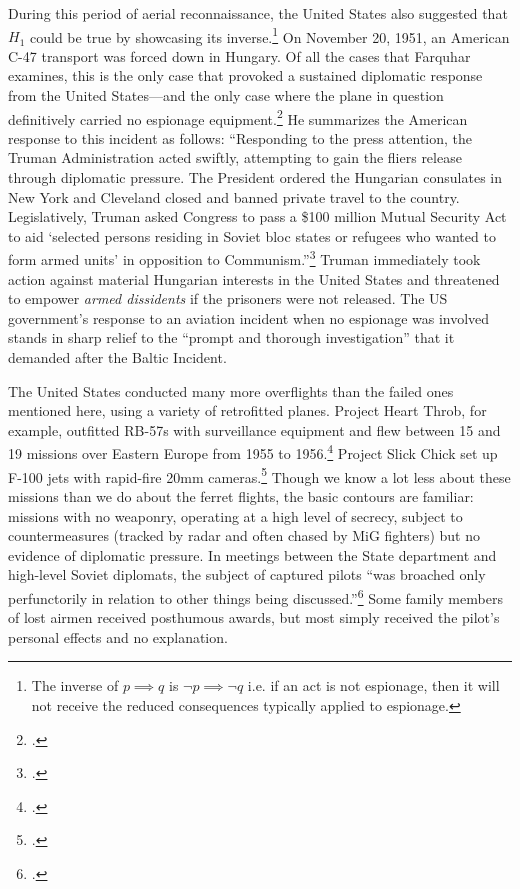 \documentclass[14pt]{extarticle}
\begin{document}
During this period of aerial reconnaissance, the United States also suggested that $H_1$ could be true by showcasing its inverse.\footnote{The inverse of $p \implies q$ is $\neg p \implies \neg q$ i.e. if an act is not espionage, then it will not receive the reduced consequences typically applied to espionage.} On November 20, 1951, an American C-47 transport was forced down in Hungary. Of all the cases that Farquhar examines, this is the only case that provoked a sustained diplomatic response from the United States---and the only case where the plane in question definitively carried no espionage equipment.\footcite[While the ferret flights were perfectly calibrated to fit as much radio surveillance equipment as possible, the only evidence of espionage that the Soviets were able to produce from the C-47---a plane that they recovered intact---was a portable radio, two extra parachutes, and some packets of warm blankets. Because it was not a ferret flight, the C-47 is omitted from the Peterson list as well.]{the_united_press_soviet_1951} He summarizes the American response to this incident as follows: \enquote{Responding to the press attention, the Truman Administration acted swiftly, attempting to gain the fliers release through diplomatic pressure. The President ordered the Hungarian consulates in New York and Cleveland closed and banned private travel to the country. Legislatively, Truman asked Congress to pass a \$100 million Mutual Security Act to aid \enquote{selected persons residing in Soviet bloc states or refugees who wanted to form armed units} in opposition to Communism.}\footcite[p.~43]{farquhar_aerial_2015} Truman immediately took action against material Hungarian interests in the United States and threatened to empower \emph{armed dissidents} if the prisoners were not released. The US government's response to an aviation incident when no espionage was involved stands in sharp relief to the \enquote{prompt and thorough investigation} that it demanded after the Baltic Incident.

The United States conducted many more overflights than the failed ones mentioned here, using a variety of retrofitted planes. Project Heart Throb, for example, outfitted RB-57s with surveillance equipment and flew between 15 and 19 missions over Eastern Europe from 1955 to 1956.\footcite[p.~194. Based on the recollection of Gerald E. Cooke, a Air Force pilot assigned to the project.]{hall_early_2003} Project Slick Chick set up F-100 jets with rapid-fire 20mm cameras.\footcite[p.~176]{hall_early_2003} Though we know a lot less about these missions than we do about the ferret flights, the basic contours are familiar: missions with no weaponry, operating at a high level of secrecy, subject to countermeasures (tracked by radar and often chased by MiG fighters) but no evidence of diplomatic pressure. In meetings between the State department and high-level Soviet diplomats, the subject of captured pilots \enquote{was broached only perfunctorily in relation to other things being discussed.}\footcite[p.~72]{brugioni_eyes_2010} Some family members of lost airmen received posthumous awards, but most simply received the pilot's personal effects and no explanation.
\end{document}
